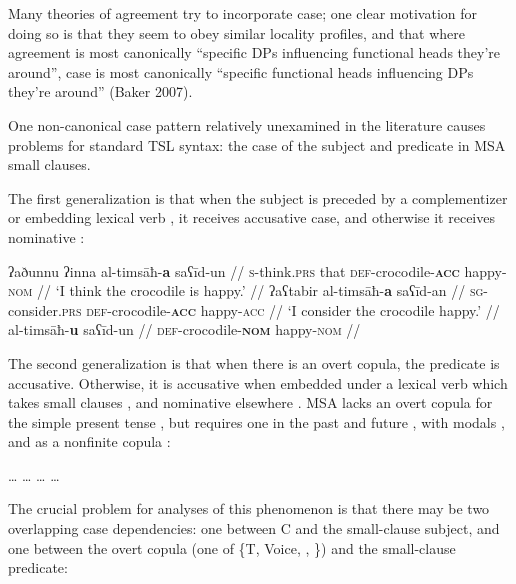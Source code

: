 
Many theories of agreement try to incorporate case; one clear motivation for doing so is that they seem to obey similar locality profiles, and that where agreement is most canonically ``specific DPs influencing functional heads they're around'', case is most canonically ``specific functional heads influencing DPs they're around'' (Baker 2007).

One non-canonical case pattern relatively unexamined in the literature causes problems for standard TSL syntax: the case of the subject and predicate in MSA small clauses.

The first generalization is that when the subject is preceded by a complementizer  or embedding lexical verb , it receives accusative case, and otherwise it receives nominative :

\pex {}
  \a \begingl \gla ʔaðunnu ʔinna al-timsāħ-\textbf{a} saʕīd-un //
      \textsc{s}-think.\textsc{prs} that \textsc{def}-crocodile-\textbf{\textsc{acc}} happy-\textsc{nom} //
      \glft `I think the crocodile is happy.' //
      \endgl
  \a \begingl \gla ʔaʕtabir al-timsāħ-\textbf{a} saʕīd-an //
      \textsc{sg}-consider.\textsc{prs} \textsc{def}-crocodile-\textbf{\textsc{acc}} happy-\textsc{acc} //
      \glft `I consider the crocodile happy.' //
      \endgl
  \a \begingl \gla al-timsāħ-\textbf{u} saʕīd-un //
      \glb \textsc{def}-crocodile-\textbf{\textsc{nom}} happy-\textsc{nom} //
      \endgl
\xe

The second generalization is that when there is an overt copula, the predicate is accusative. Otherwise, it is accusative when embedded under a lexical verb which takes small clauses , and nominative elsewhere . MSA lacks an overt copula for the simple present tense , but requires one in the past  and future , with modals , and as a nonfinite copula :

\pex {}
  \a \ldots
  \a \ldots
  \a \ldots
  \a \ldots
\xe

The crucial problem for analyses of this phenomenon is that there may be two overlapping case dependencies: one between C and the small-clause subject, and one between the overt copula (one of \{T, Voice, \lv, \rt{}\}) and the small-clause predicate:

